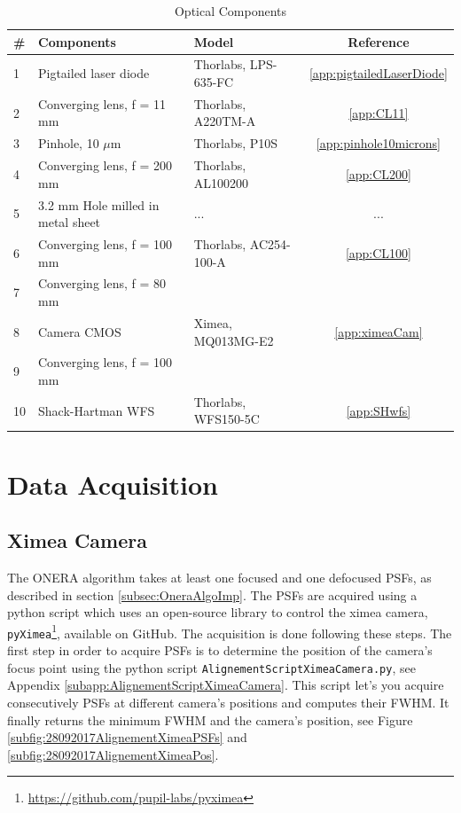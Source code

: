 \begin{table}
\caption{Optical Components}
\label{tab:optComp}
\centering
\begin{tabular}{|l|l|l|c|}
\hline
\textbf{\#}& \textbf{Components} & \textbf{Model} & \textbf{Reference} \\\hline
1 & Pigtailed laser diode & Thorlabs, LPS-635-FC & \ref{app:pigtailedLaserDiode} \\\hline
2 & Converging lens, f = 11 mm & Thorlabs, A220TM-A & \ref{app:CL11} \\\hline
3 & Pinhole, 10 $\mu$m & Thorlabs, P10S & \ref{app:pinhole10microns} \\\hline
4 & Converging lens, f = 200 mm & Thorlabs, AL100200 & \ref{app:CL200} \\\hline
5 & 3.2 mm Hole milled in metal sheet & ... & ... \\\hline
6 & Converging lens, f = 100 mm & Thorlabs, AC254-100-A & \ref{app:CL100} \\\hline
7 & Converging lens, f = 80 mm & & \\\hline
8 & Camera CMOS & Ximea, MQ013MG-E2 & \ref{app:ximeaCam} \\\hline
9 & Converging lens, f = 100 mm & & \\\hline
10 & Shack-Hartman WFS & Thorlabs, WFS150-5C & \ref{app:SHwfs} \\\hline
\end{tabular}
\end{table}

\section{Data Acquisition}
\label{sec:DataAcquis}

\subsection{Ximea Camera}
\label{subsec:acquisXimCam}

The ONERA algorithm takes at least one focused and one defocused PSFs, as described in section \ref{subsec:OneraAlgoImp}. The PSFs are acquired using a python script which uses an open-source library to control the ximea camera, \verb|pyXimea|\footnote{\url{https://github.com/pupil-labs/pyximea}}, available on GitHub. The acquisition is done following these steps. The first step in order to acquire PSFs is to determine the position of the camera's focus point using the python script \verb|AlignementScriptXimeaCamera.py|, see Appendix \ref{subapp:AlignementScriptXimeaCamera}. This script let's you acquire consecutively PSFs at different camera's positions and computes their FWHM. It finally returns the minimum FWHM and the camera's position, see Figure \ref{subfig:28092017AlignementXimeaPSFs} and \ref{subfig:28092017AlignementXimeaPos}.

